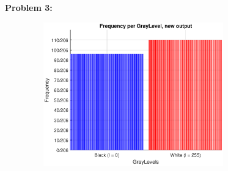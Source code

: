 \documentclass[11pt]{article}
\newenvironment{problem}[1]{\textbf{Problem #1: }}{\newpage}
\begin{document}
\begin{problem}{3}
\begin{figure}[h!]
			\includegraphics[width = 9cm, height = 6.25cm]{Matlab/G3.eps}
		\end{figure}
		
	\end{problem}
	
\end{document}
